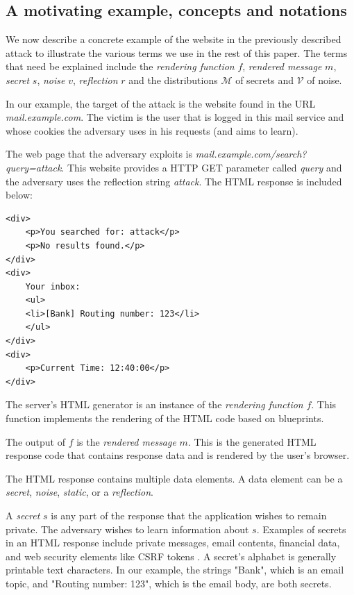 \subsection{A motivating example, concepts and notations}\label{subsec:terms}
We now describe a concrete example of the website in the previously described
attack to illustrate the various terms we use in the rest of this paper. The
terms that need be explained include the \textit{rendering function} $f$,
\textit{rendered message} $m$, \textit{secret} $s$, \textit{noise} $v$,
\textit{reflection} $r$ and the distributions $\mathcal{M}$ of secrets and
$\mathcal{V}$ of noise.

In our example, the target of the attack is the website found in the URL
\textit{mail.example.com}. The victim is the user that is logged in this mail
service and whose cookies the adversary uses in his requests (and aims to
learn).

The web page that the adversary exploits is
\textit{mail.example.com/search?query=attack}. This website provides a HTTP GET
parameter called \textit{query} and the adversary uses the reflection string
\textit{attack}. The HTML response is included below:

\begin{lstlisting}[basicstyle=\small\ttfamily]
<div>
    <p>You searched for: attack</p>
    <p>No results found.</p>
</div>
<div>
    Your inbox:
    <ul>
    <li>[Bank] Routing number: 123</li>
    </ul>
</div>
<div>
    <p>Current Time: 12:40:00</p>
</div>
\end{lstlisting}

The server's HTML generator is an instance of the \textit{rendering function}
$f$. This function implements the rendering of the HTML code based on
blueprints.

The output of $f$ is the \textit{rendered message} $m$. This is the generated
HTML response code that contains response data and is rendered by the user's
browser.

The HTML response contains multiple data elements. A data element can be a
\textit{secret}, \textit{noise}, \textit{static}, or a \textit{reflection}.

A \textit{secret} $s$ is any part of the response that the application wishes to
remain private. The adversary wishes to learn information about $s$. Examples of
secrets in an HTML response include private messages, email contents, financial
data, and web security elements like CSRF tokens \cite{de2011automatic}. A
secret's alphabet is generally printable text characters. In our example, the
strings "Bank", which is an email topic, and "Routing number: 123", which is the
email body, are both secrets.

